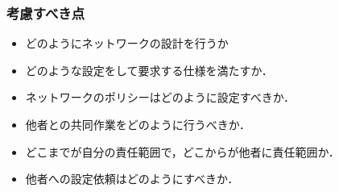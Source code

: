 \subsubsection*{考慮すべき点}
\begin{itemize}
\item どのようにネットワークの設計を行うか
\item どのような設定をして要求する仕様を満たすか．
\item ネットワークのポリシーはどのように設定すべきか．
\item 他者との共同作業をどのように行うべきか．
\item どこまでが自分の責任範囲で，どこからが他者に責任範囲か．
\item 他者への設定依頼はどのようにすべきか．
\end{itemize}

